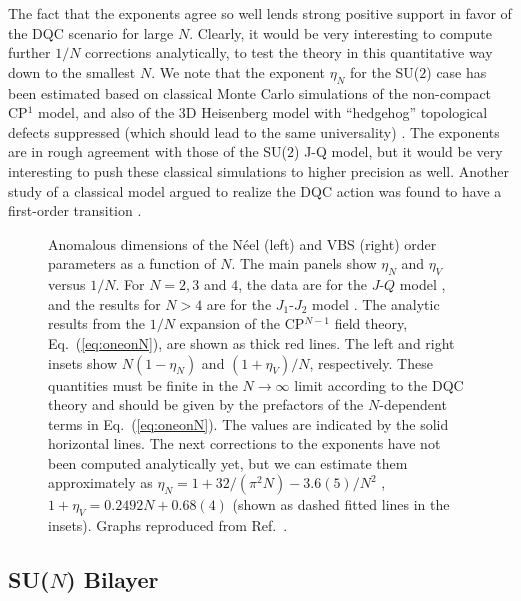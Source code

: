 \documentclass[range]{ar2e}
\begin{document}
The fact that the exponents agree so well lends strong positive support in favor of the DQC scenario for large $N$. Clearly, it would be 
very interesting to compute further $1/N$ corrections analytically, to test the theory in this quantitative way down to the smallest $N$. We note 
that the exponent $\eta_N$ for the SU($2$) case has been estimated based on classical Monte Carlo simulations of the non-compact CP$^1$ model, and
also of the 3D Heisenberg model with ``hedgehog'' topological defects suppressed (which should lead to the same universality) \cite{Motrunich04}. 
The exponents are in rough agreement with those of the SU($2$) J-Q model, but it would be very interesting to push these classical simulations to 
higher precision as well. Another study of a classical model argued to realize the DQC action was found to have a first-order 
transition \cite{Kuklov08}.

\begin{figure}
\centerline{}
 \caption{ \label{fig:exp} Anomalous dimensions of the N\'eel (left) and VBS (right)
  order parameters as a function of $N$. The main panels show $\eta_N$ and $\eta_V$ versus $1/N$. For $N=2,3$ and $4$, the data are 
  for the $J$-$Q$ model \cite{lou2009:sun}, and the results for $N>4$ are for the $J_1$-$J_2$ model \cite{kaul2011:j1j2}. The analytic 
  results from the $1/N$ expansion of the CP$^{N-1}$ field theory, Eq.~(\ref{eq:oneonN}), are shown as thick red lines. The left and 
  right insets show $N(1-\eta_N)$ and $(1+\eta_V)/N$, respectively. These quantities must be finite in the  $N\rightarrow \infty$ 
  limit according to the DQC theory and should be given by the prefactors of the $N$-dependent terms in Eq.~(\ref{eq:oneonN}). The values
  are indicated by the solid horizontal lines. The next corrections to the exponents have not been computed analytically yet, but we can estimate 
  them approximately as $\eta_N = 1+32/(\pi^2 N)-3.6(5)/N^2$ , $1+\eta_V = 0.2492 N + 0.68(4)$ (shown as dashed fitted lines in the insets). 
  Graphs reproduced from Ref.~\cite{kaul2011:j1j2}.}
\end{figure}

\subsection{SU($N$) Bilayer}
\label{ss:bilN}
\end{document}
